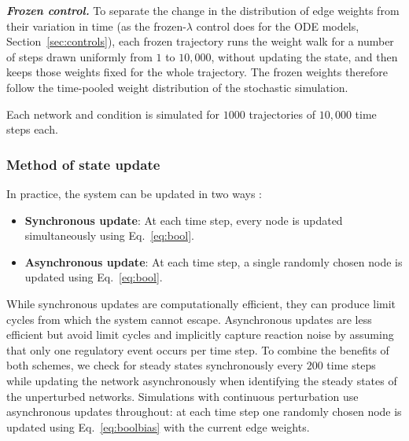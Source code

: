 \documentclass[11pt]{article}
\providecommand{\DIFaddtex}[1]{{\protect\color{red}#1}} %
\providecommand{\DIFdeltex}[1]{} %
\providecommand{\DIFaddbegin}{} %
\providecommand{\DIFaddend}{} %
\providecommand{\DIFdelbegin}{} %
\providecommand{\DIFdelend}{} %
\providecommand{\DIFadd}[1]{\texorpdfstring{\DIFaddtex{#1}}{#1}} %
\providecommand{\DIFdel}[1]{\texorpdfstring{\DIFdeltex{#1}}{}} %
\providecommand{\DIFaddincludegraphics}[2][]{\DIFOincludegraphics[#1]{#2}} %
\providecommand{\DIFdelincludegraphics}[2][]{}
\DeclareRobustCommand{\DIFaddbegin}{\DIFOaddbegin \let\includegraphics\DIFaddincludegraphics} %
\DeclareRobustCommand{\DIFaddend}{\DIFOaddend \let\includegraphics\DIFOincludegraphics} %
\DeclareRobustCommand{\DIFdelbegin}{\DIFOdelbegin \let\includegraphics\DIFdelincludegraphics} %
\DeclareRobustCommand{\DIFdelend}{\DIFOaddend \let\includegraphics\DIFOincludegraphics} %
\begin{document}
\DIFdelbegin \DIFdel{In all three modes, $\sigma^2 = 0.01$ is used as the noise variance.
Each biological network }\DIFdelend \DIFaddbegin \noindent\textbf{\textit{\DIFadd{Frozen control.}}} \DIFadd{To separate the change in the distribution of edge weights from their variation in time (as the frozen-$\lambda$ control does for the ODE models, Section~\ref{sec:controls}), each frozen trajectory runs the weight walk for a number of steps drawn uniformly from $1$ to $10{,}000$, without updating the state, and then keeps those weights fixed for the whole trajectory. The frozen weights therefore follow the time-pooled weight distribution of the stochastic simulation.
}

\DIFadd{Each network and condition }\DIFaddend is simulated for $1000$ trajectories of $10{,}000$ time steps each\DIFdelbegin \DIFdel{; artificial networks are simulated for $100$ trajectories of $1{,}000$ time steps each}\DIFdelend .

\subsubsection{Method of state update}
In practice, the system can be updated in two ways \cite{garg2008synchronous, schwab2020concepts}:
\begin{itemize}
    \item \textbf{Synchronous update}: At each time step, every node is updated simultaneously using Eq.~\ref{eq:bool}.
    \item \textbf{Asynchronous update}: At each time step, a single randomly chosen node is updated using Eq.~\ref{eq:bool}.
\end{itemize}
While synchronous updates are computationally efficient, they can produce limit cycles from which the system cannot escape. Asynchronous updates are less efficient but avoid limit cycles and implicitly capture reaction noise by assuming that only one regulatory event occurs per time step. To combine the benefits of both schemes, we check for steady states synchronously every $200$ time steps while updating the network asynchronously \DIFdelbegin \DIFdel{. For continuous perturbation simulations, synchronous updates are used throughout, as persistent perturbations make entrapment in limit cycles unlikely.}\DIFdelend \DIFaddbegin \DIFadd{when identifying the steady states of the unperturbed networks. Simulations with continuous perturbation use asynchronous updates throughout: at each time step one randomly chosen node is updated using Eq.~\ref{eq:boolbias} with the current edge weights.
}\DIFaddend 
\end{document}
